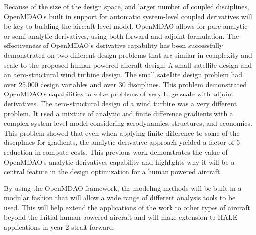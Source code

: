 \documentclass[]{aiaa-tc}
\begin{document}
    Because of the size of the design space, and larger number of coupled disciplines, OpenMDAO's built in support for 
    automatic system-level coupled derivatives will be key to building the aircraft-level model. OpenMDAO allows for 
    pure analytic or semi-analytic derivatives, using both forward and adjoint formulation. The effectiveness of OpenMDAO's 
    derivative capability has been successfully demonstrated on two different design problems that are similar in complexity 
    and scale to the proposed human powered aircraft design: A small satellite design and an aero-structural 
    wind turbine design\cite{gray2014derivatives}. The small satellite design problem had over 25,000 design variables 
    and over 30 disciplines. This problem demonstrated OpenMDAO's capabilities to solve problems of very large scale with adjoint 
    derivatives. The aero-structural design of a wind turbine was a very different problem. It used a mixture of analytic and 
    finite difference gradients with a complex system level model considering aerodynamics, structures, and economics. 
    This problem showed that even when applying finite difference to some of the disciplines for gradients, the analytic 
    derivative approach yielded a factor of 5 reduction in compute costs. This previous work demonstrates the 
    value of OpenMDAO's analytic derivatives capability and highlights why it will be a central feature in the design 
    optimization for a human powered aircraft. 

    By using the OpenMDAO framework, the modeling methods will be built in a modular fashion that will allow a wide range of
    different analysis tools to be used. This will help extend the applications of the work to other types of aircraft beyond the 
    initial human powered aircraft and will make extension to HALE applications in year 2 strait forward. 

\end{document}
